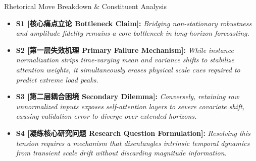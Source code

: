 \begin{TipBox}{Rhetorical Move Breakdown \& Constituent Analysis}
\begin{itemize}[leftmargin=1.5em]
  \item \textbf{S1 [核心痛点立论 Bottleneck Claim]:} \textit{Bridging non-stationary robustness and amplitude fidelity remains a core bottleneck in long-horizon forecasting.}\par{}
  \item \textbf{S2 [第一层失效机理 Primary Failure Mechanism]:} \textit{While instance normalization strips time-varying mean and variance shifts to stabilize attention weights, it simultaneously erases physical scale cues required to predict extreme load peaks.}\par{}
  \item \textbf{S3 [第二层耦合困境 Secondary Dilemma]:} \textit{Conversely, retaining raw unnormalized inputs exposes self-attention layers to severe covariate shift, causing validation error to diverge over extended horizons.}\par{}
  \item \textbf{S4 [凝练核心研究问题 Research Question Formulation]:} \textit{Resolving this tension requires a mechanism that disentangles intrinsic temporal dynamics from transient scale drift without discarding magnitude information.}\par{}
\end{itemize}
\end{TipBox}
\medskip
